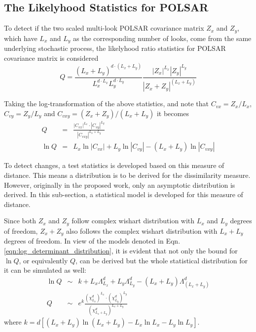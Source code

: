 \documentclass[journal]{IEEEtran}
\begin{document}
\subsection{The Likelyhood Statistics for POLSAR}

To detect if the two scaled multi-look POLSAR covariance matrix $Z_x$ and $Z_y$,
  which have $L_x$ and $L_y$ as the corresponding number of looks,
  come from the same underlying stochastic process,
the likelyhood ratio statistics for POLSAR covariance matrix is considered \cite{Conradsen_2003_TGRS_4} 
\begin{equation}
  Q = \frac{(L_x+L_y)^{d \cdot (L_x+L_y)}}{L_x^{d \cdot L_x} L_y^{d \cdot L_y}} \frac{|Z_x|^{L_x} |Z_y|^{L_y} }{|Z_x+Z_y|^{(L_x+L_y)}}
\end{equation}

Taking the log-transformation of the above statistics, and note that $C_{vx} = Z_x / L_x$, $C_{vy} = Z_y / L_y$ and $C_{vxy} = (Z_x + Z_y)/(L_x + L_y)$ it becomes 
\begin{eqnarray}
  Q &=& \frac{|C_{vx}|^{L_x} \cdot |C_{vy}|^{L_y} }{|C_{vxy}|^{L_x + L_y}} \nonumber \\
  \ln Q &=& L_x \ln |C_{vx}| + L_y \ln |C_{vy}| - (L_x + L_y) \ln |C_{vxy}| \nonumber
\end{eqnarray}

To detect changes, a test statistics is developed based on this measure of distance.
This means a distribution is to be derived for the dissimilarity measure.
However, originally in the proposed work, only an asymptotic distribution is derived.
In this sub-section, a statistical model is developed for this measure of distance.

Since both $Z_x$ and $Z_y$ follow complex wishart distribution with $L_x$ and $L_y$ degrees of freedom,
  $Z_x+Z_y$ also follows the complex wishart distribution with $L_x + L_y$ degrees of freedom.
In view of the models denoted in Eqn. \ref{eqn:log_determinant_distribution},
  it is evident that not only the bound for $\ln Q$, or equivalently $Q$, can be derived
  but the whole statistical distribution for it can be simulated as well:
\begin{eqnarray}
  \ln{Q} &\sim&  k + L_x \Lambda^d_{L_x} + L_y \Lambda^d_{L_y} - (L_x + L_y) \Lambda^d_{(L_x + L_y)} \\
  Q &\sim& e^k \frac{(\chi^d_{L_x})^{L_x} \cdot (\chi^d_{L_y})^{L_y}}{(\chi^d_{L_x + L_y})^{L_x + L_y}}  
\end{eqnarray}
where $k = d \left[ (L_x + L_y) \ln(L_x + L_y) - L_x \ln{L_x} - L_y \ln{L_y} \right]$.
\end{document}
